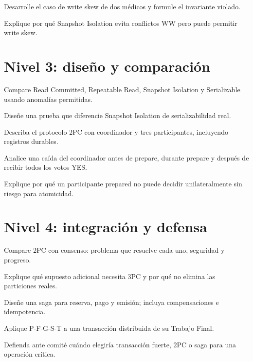 \documentclass[variant=guia,cover=institutional,mode=screen]{ua-engineering-v6-article}
\begin{document}
\begin{uaexercise}
Desarrolle el caso de write skew de dos médicos y formule el invariante violado.
\end{uaexercise}

\begin{uaexercise}
Explique por qué Snapshot Isolation evita conflictos WW pero puede permitir write skew.
\end{uaexercise}


\section{Nivel 3: diseño y comparación}
\begin{uaexercise}
Compare Read Committed, Repeatable Read, Snapshot Isolation y Serializable usando anomalías permitidas.
\end{uaexercise}

\begin{uaexercise}
Diseñe una prueba que diferencie Snapshot Isolation de serializabilidad real.
\end{uaexercise}

\begin{uaexercise}
Describa el protocolo 2PC con coordinador y tres participantes, incluyendo registros durables.
\end{uaexercise}

\begin{uaexercise}
Analice una caída del coordinador antes de prepare, durante prepare y después de recibir todos los votos YES.
\end{uaexercise}

\begin{uaexercise}
Explique por qué un participante prepared no puede decidir unilateralmente sin riesgo para atomicidad.
\end{uaexercise}


\section{Nivel 4: integración y defensa}
\begin{uaexercise}
Compare 2PC con consenso: problema que resuelve cada uno, seguridad y progreso.
\end{uaexercise}

\begin{uaexercise}
Explique qué supuesto adicional necesita 3PC y por qué no elimina las particiones reales.
\end{uaexercise}

\begin{uaexercise}
Diseñe una saga para reserva, pago y emisión; incluya compensaciones e idempotencia.
\end{uaexercise}

\begin{uaexercise}
Aplique P-F-G-S-T a una transacción distribuida de su Trabajo Final.
\end{uaexercise}

\begin{uaexercise}
Defienda ante comité cuándo elegiría transacción fuerte, 2PC o saga para una operación crítica.
\end{uaexercise}
\end{document}
